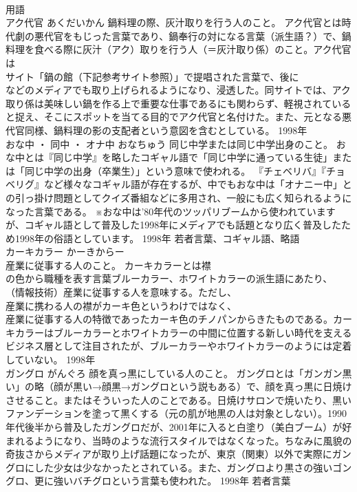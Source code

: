 \documentclass[8pt]{extreport}
\begin{document}
\begin{CJK}{UTF8}{min}
\\	用語	
\\	アク代官	あくだいかん	鍋料理の際、灰汁取りを行う人のこと。	アク代官とは時代劇の悪代官をもじった言葉であり、鍋奉行の対になる言葉（派生語？）で、鍋料理を食べる際に灰汁（アク）取りを行う人（＝灰汁取り係）のこと。アク代官は
\\	サイト「鍋の館（下記参考サイト参照）」で提唱された言葉で、後に
\\	などのメディアでも取り上げられるようになり、浸透した。同サイトでは、アク取り係は美味しい鍋を作る上で重要な仕事であるにも関わらず、軽視されていると捉え、そこにスポットを当てる目的でアク代官と名付けた。また、元となる悪代官同様、鍋料理の影の支配者という意図を含むとしている。	1998年	
\\	おな中 ・ 同中 ・ オナ中	おなちゅう	同じ中学または同じ中学出身のこと。	おな中とは『同じ中学』を略したコギャル語で「同じ中学に通っている生徒」または「同じ中学の出身（卒業生）」という意味で使われる。 『チェベリバ』『チョベリグ』など様々なコギャル語が存在するが、中でもおな中は「オナニー中」との引っ掛け問題としてクイズ番組などに多用され、一般にも広く知られるようになった言葉である。 ※おな中は'80年代のツッパリブームから使われていますが、コギャル語として普及した1998年にメディアでも話題となり広く普及したため1998年の俗語としています。	1998年	若者言葉、コギャル語、略語	
\\	カーキカラー	かーきからー	
\\	産業に従事する人のこと。	カーキカラーとは襟
\\	の色から職種を表す言葉ブルーカラー、ホワイトカラーの派生語にあたり、
\\	（情報技術）産業に従事する人を意味する。ただし、
\\	産業に携わる人の襟がカーキ色というわけではなく、
\\	産業に従事する人の特徴であったカーキ色のチノパンからきたものである。カーキカラーはブルーカラーとホワイトカラーの中間に位置する新しい時代を支えるビジネス層として注目されたが、ブルーカラーやホワイトカラーのようには定着していない。	1998年	
\\	ガングロ	がんぐろ	顔を真っ黒にしている人のこと。	ガングロとは「ガンガン黒い」の略（顔が黒い→顔黒→ガングロという説もある）で、顔を真っ黒に日焼けさせること。またはそういった人のことである。日焼けサロンで焼いたり、黒いファンデーションを塗って黒くする（元の肌が地黒の人は対象としない）。1990年代後半から普及したガングロだが、2001年に入ると白塗り（美白ブーム）が好まれるようになり、当時のような流行スタイルではなくなった。ちなみに風貌の奇抜さからメディアが取り上げ話題になったが、東京（関東）以外で実際にガングロにした少女は少なかったとされている。また、ガングロより黒さの強いゴングロ、更に強いバチグロという言葉も使われた。	1998年	若者言葉	

\end{CJK}
\end{document}
